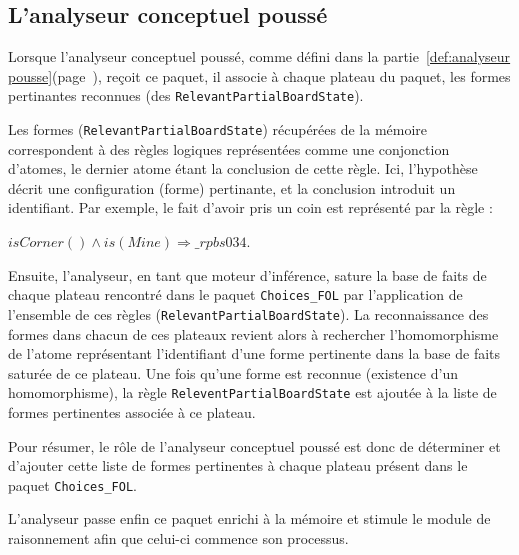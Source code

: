 \subsection{L'analyseur conceptuel poussé}
Lorsque l'analyseur conceptuel poussé, comme défini dans la partie~\ref{def:analyseur pousse}(page~\pageref{def:analyseur pousse}), reçoit ce paquet, il associe à chaque plateau du paquet, les formes pertinantes reconnues (des \texttt{RelevantPartialBoardState}).

Les formes (\texttt{RelevantPartialBoardState}) récupérées de la mémoire correspondent à des règles logiques représentées comme une conjonction d'atomes, le dernier atome étant la conclusion de cette règle. Ici, l'hypothèse décrit une configuration (forme) pertinante, et la conclusion introduit un identifiant. Par exemple, le fait d'avoir pris un coin est représenté par la règle :

\textit{$isCorner() \wedge is(Mine) \Longrightarrow \_rpbs034$}. 

Ensuite, l'analyseur, en tant que moteur d'inférence, sature la base de faits de chaque plateau rencontré dans le paquet \texttt{Choices\_FOL} par l'application de l'ensemble de ces règles (\texttt{RelevantPartialBoardState}). La reconnaissance des formes dans chacun de ces plateaux revient alors à rechercher l'homomorphisme de l'atome représentant l'identifiant d'une forme pertinente dans la base de faits saturée de ce plateau. Une fois qu'une forme est reconnue (existence d'un homomorphisme), la règle \texttt{ReleventPartialBoardState} est ajoutée à la liste de formes pertinentes associée à ce plateau.

Pour résumer, le rôle de l'analyseur conceptuel poussé est donc de déterminer et d'ajouter cette liste de formes pertinentes à chaque plateau présent dans le paquet \texttt{Choices\_FOL}. 

L'analyseur passe enfin ce paquet enrichi à la mémoire et stimule le module de raisonnement afin que celui-ci commence son processus. 